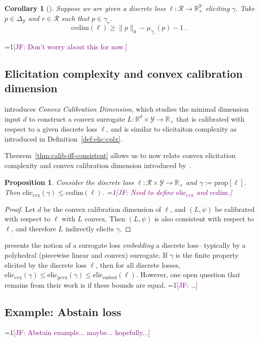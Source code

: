 \documentclass{article}
\newcommand{\Comments}{1}
\newcommand{\mynote}[2]{\ifnum\Comments=1\textcolor{#1}{#2}\fi}
\newcommand{\jessie}[1]{\mynote{purple}{[JF: #1]}}
\newcommand{\reals}{\mathbb{R}}
\newcommand{\simplex}{\Delta_\Y}
\newcommand{\prop}[1]{\mathrm{prop}[#1]}
\newcommand{\eliccvx}{\mathrm{elic}_\mathrm{cvx}}
\newcommand{\elicpoly}{\mathrm{elic}_\mathrm{pcvx}}
\newcommand{\elicembed}{\mathrm{elic}_\mathrm{embed}}
\newcommand{\ccdim}{\mathrm{ccdim}}
\newcommand{\R}{\mathcal{R}}
\newcommand{\Y}{\mathcal{Y}}
\newtheorem{proposition}{Proposition}
\newtheorem{corollary}{Corollary}
\begin{document}
\begin{corollary}[\cite{ramaswamy2016convex}]
	Suppose we are given a discrete loss $\ell:\R \to \reals^\Y_+$ eliciting $\gamma$.
	Take $p \in \simplex$ and $r \in \R$ such that $p \in \gamma_r$.
	\begin{equation}
	\ccdim(\ell) \geq \|p\|_0 - \mu_{\gamma_r}(p) - 1~.~
	\end{equation}
\end{corollary}



\jessie{Don't worry about this for now.}
\subsection{Elicitation complexity and convex calibration dimension}
\cite{ramaswamy2016convex} introduces \emph{Convex Calibration Dimension}, which studies the minimal dimension input $d$ to construct a convex surrogate $L : \reals^d \times \Y \to \reals_+$ that is calibrated with respect to a given discrete loss $\ell$, and is similar to elicitaiton complexity as introduced in Definition~\ref{def:elic:cplx}.

Theorem~\ref{thm:calib-iff-consistent} allows us to now relate convex elicitation complexity and convex calibration dimension introduced by~\cite[Definition 10]{ramaswamy2016convex}.
\begin{proposition}
	Consider the discrete loss $\ell : \R \times \Y \to \reals_+$ and $\gamma:= \prop{\ell}$.
	Then $\eliccvx(\gamma) \leq \ccdim(\ell)$.
	\jessie{Need to define $\eliccvx$ and $\ccdim$.}
\end{proposition}
\begin{proof}
	Let $d$ be the convex calibration dimension of $\ell$, and $(L, \psi)$ be calibrated with respect to $\ell$ with $L$ convex.
	Then $(L, \psi)$ is also consistent with respect to $\ell$, and therefore $L$ indirectly elicits $\gamma$.
\end{proof}

\cite{finocchiaro2019embedding} presents the notion of a surrogate loss \emph{embedding} a discrete loss-- typically by a polyhedral (piecewise linear and convex) surrogate.
If $\gamma$ is the finite property elicited by the discrete loss $\ell$, then for all discrete losses, $\eliccvx(\gamma) \leq \elicpoly(\gamma) \leq \elicembed(\ell)$.
However, one open question that remains from their work is if these bounds are equal. \jessie{\ldots} 


\subsection{Example: Abstain loss}
\jessie{Abstain example... maybe... hopefully...}
\end{document}
